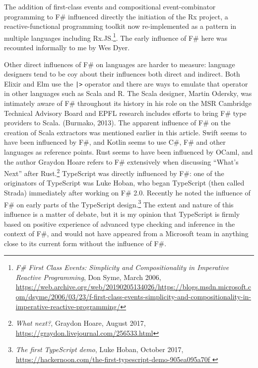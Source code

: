\documentclass[acmsmall]{acmart}\settopmatter{}
\begin{document}
The addition of first-class events and compositional event-combinator programming to F\# influenced directly the initiation
of the Rx project, a reactive-functional programming toolkit now re-implemented as a pattern in multiple languages
including Rx.JS.\footnote{\textit{F\# First Class Events: Simplicity and Compositionality in Imperative Reactive Programming}, Don Syme, March 2006, \url{https://web.archive.org/web/20190205134026/https://blogs.msdn.microsoft.com/dsyme/2006/03/23/f-first-class-events-simplicity-and-compositionality-in-imperative-reactive-programming/}}.   The early influence of F\# here was recounted informally to me by Wes Dyer. 

Other direct influences of F\# on languages are harder to measure: language designers tend to be coy about their
influences both direct and indirect. Both Elixir and Elm use the \texttt{|>} operator and there are ways to emulate that operator
in other languages such as Scala and R. The Scala designer, Martin Odersky, was intimately aware of F\# throughout
its history in his role on the MSR Cambridge Technical Advisory Board and EPFL research includes efforts to
bring F\# type providers to Scala. (Burmako, 2013).  The apparent influence of F\# on the
creation of Scala extractors was mentioned earlier in this article. Swift seems to have been influenced
by F\#, and Kotlin seems to use C\#, F\# and other languages as reference points.  Rust seems to have been
influenced by OCaml, and the author Graydon Hoare refers to F\# extensively when discussing “What’s Next” after
Rust.\footnote{\textit{What next?}, Graydon Hoare, August 2017, \url{https://graydon.livejournal.com/256533.html}}
TypeScript was directly influenced by F\#: one of the originators of TypeScript was
Luke Hoban, who began TypeScript (then called Strada) immediately after working on F\# 2.0. Recently
he noted the influence of F\# on early parts of the TypeScript
design.\footnote{\textit{The first TypeScript demo}, Luke Hoban, October 2017, \url{https://hackernoon.com/the-first-typescript-demo-905ea095a70f }} The
extent and nature of this influence is a matter of debate, but it is my opinion that TypeScript is firmly based on positive experience of advanced type checking and inference
in the context of F\#, and would not have appeared from a Microsoft team in anything close to its current form without the influence of F\#.
\end{document}
